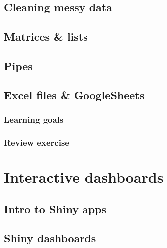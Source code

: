 \documentclass[
]{book}
\begin{document}
\hypertarget{cleaning-messy-data}{%
\chapter{Cleaning messy data}\label{cleaning-messy-data}}

\hypertarget{matrices-lists}{%
\chapter{Matrices \& lists}\label{matrices-lists}}

\hypertarget{pipes}{%
\chapter{Pipes}\label{pipes}}

\hypertarget{excel-files-googlesheets}{%
\chapter{Excel files \& GoogleSheets}\label{excel-files-googlesheets}}

\hypertarget{learning-goals-16}{%
\section*{Learning goals}\label{learning-goals-16}}

\hypertarget{review-exercise-4}{%
\section*{Review exercise}\label{review-exercise-4}}

\hypertarget{part-interactive-dashboards}{%
\part{Interactive dashboards}\label{part-interactive-dashboards}}

\hypertarget{intro-to-shiny-apps}{%
\chapter{Intro to Shiny apps}\label{intro-to-shiny-apps}}

\hypertarget{shiny-dashboards}{%
\chapter{Shiny dashboards}\label{shiny-dashboards}}
\end{document}
